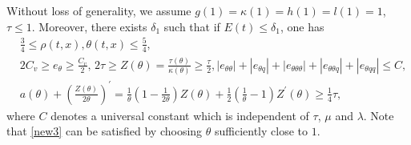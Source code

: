 \documentclass[11pt,reqno]{amsart}
\numberwithin{equation}{section}
\begin{document}
Without loss of generality, we assume $g(1)=\kappa(1)=h(1)=l(1)=1$, $\tau \le 1$.  Moreover, there exists  $\delta_1$ such that if $E(t)\le \delta_1$, one has
\begin{align}
&\frac{3}{4}\le \rho(t,x),\theta(t,x)\le\frac{5}{4}, \label{new1}\\
&2C_v\ge e_{\theta}\ge \frac{C_v}{2},\, 2\tau \ge Z(\theta)=\frac{\tau   (\theta)}{\kappa(\theta)}\ge \frac{\tau   }{2}, |e_{\theta\theta}|+|e_{\theta q}|+|e_{\theta \theta\theta}|+
|e_{\theta \theta q}|+|e_{\theta q q}| \le C, \label{new2}\\
&a(\theta)+\left(\frac{Z(\theta)}{2\theta}\right)^\prime=\frac{1}{\theta}(1-\frac{1}{2\theta}) Z(\theta)+\frac{1}{2}(\frac{1}{\theta}-1) Z^\prime(\theta) \ge \frac{1}{4} \tau ,   \label{new3}
\end{align}
where $ C$ denotes a universal constant which is independent of $\tau  $, $\mu$ and $\lambda$. Note that \eqref{new3} can be satisfied by choosing $\theta$ sufficiently close to $1$.
\end{document}
